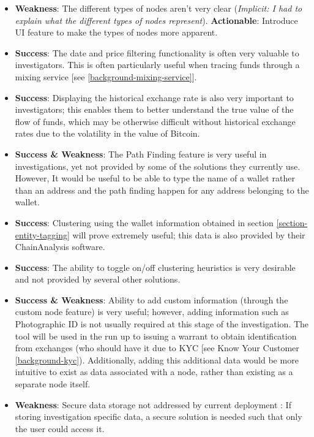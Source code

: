 \begin{itemize}
    \item \textbf{Weakness}: The different types of nodes aren't very clear (\textit{Implicit: I had to explain what the different types of nodes represent}). \textbf{Actionable}: Introduce UI feature to make the types of nodes more apparent. 
    \item \textbf{Success}: The date and price filtering functionality is often very valuable to investigators. This is often particularly useful when tracing funds through a mixing service [see \ref{background-mixing-service}]. 
    \item \textbf{Success}: Displaying the historical exchange rate is also very important to investigators; this enables them to better understand the true value of the flow of funds, which may be otherwise difficult without historical exchange rates due to the volatility in the value of Bitcoin. 
    \item \textbf{Success \& Weakness}: The Path Finding feature is very useful in investigations, yet not provided by some of the solutions they currently use. However, It would be useful to be able to type the name of a wallet rather than an address and the path finding happen for any address belonging to the wallet. 
    \item \textbf{Success}: Clustering using the wallet information obtained in section \ref{section-entity-tagging} will prove extremely useful; this data is also provided by their ChainAnalysis software. 
    \item \textbf{Success}: The ability to toggle on/off clustering heuristics is very desirable and not provided by several other solutions. 
    \item \textbf{Success \& Weakness}: Ability to add custom information (through the custom node feature) is very useful; however, adding information such as Photographic ID is not usually required at this stage of the investigation. The tool will be used in the run up to issuing a warrant to obtain identification from exchanges (who should have it due to KYC [see Know Your Customer \ref{background-kyc}). Additionally, adding this additional data would be more intuitive to exist as data associated with a node, rather than existing as a separate node itself. 
    \item \textbf{Weakness}: Secure data storage not addressed by current deployment : If storing investigation specific data, a secure solution is needed such that only the user could access it. 
\end{itemize}

